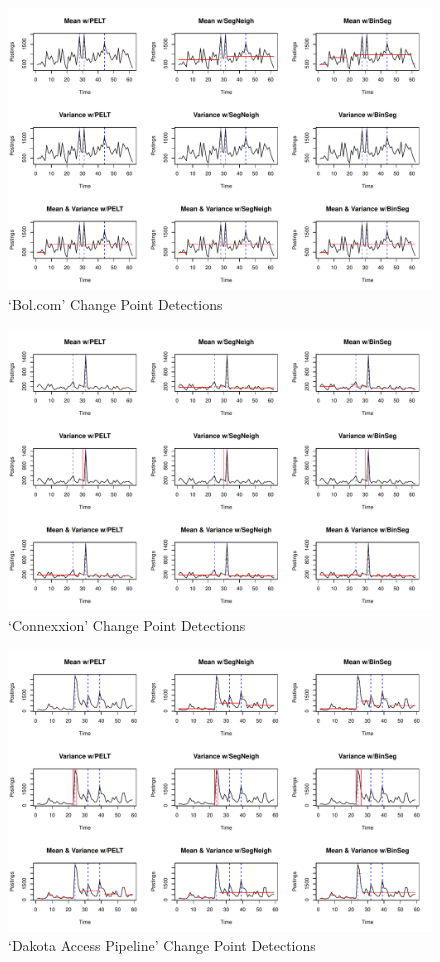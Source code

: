 \documentclass[../main.tex]{subfiles}
\begin{document}
\begin{figure}[h]
    \includegraphics[width=\textwidth]{figures/bolresults}
    \caption{`Bol.com' Change Point Detections}
    \label{fig:bol}
\end{figure}


\begin{figure}[h]
    \includegraphics[width=\textwidth]{figures/connexxionresults}
    \caption{`Connexxion' Change Point Detections}
    \label{fig:connexxion}
\end{figure}

\begin{figure}[h]
    \includegraphics[width=\textwidth]{figures/dapresults}
    \caption{`Dakota Access Pipeline' Change Point Detections}
    \label{fig:dap}
\end{figure}
\end{document}
